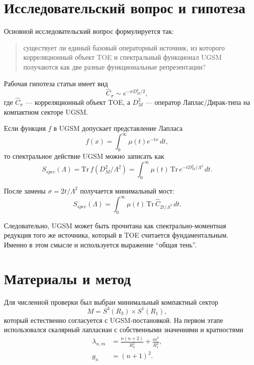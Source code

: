 \documentclass[12pt,a4paper]{article}
\begin{document}
\section{Исследовательский вопрос и гипотеза}

Основной исследовательский вопрос формулируется так:
\begin{quote}
существует ли единый базовый операторный источник, из которого корреляционный объект TOE и спектральный функционал UGSM получаются как две разные функциональные репрезентации?
\end{quote}

Рабочая гипотеза статьи имеет вид
\begin{equation}
\hat C_\sigma \sim e^{-\sigma D_M^2/2},
\end{equation}
где \(\hat C_\sigma\) --- корреляционный объект TOE, а \(D_M^2\) --- оператор Лаплас/Дирак-типа на компактном секторе UGSM.

Если функция \(f\) в UGSM допускает представление Лапласа
\begin{equation}
f(x)=\int_0^{\infty}\mu(t)e^{-tx}\,dt,
\end{equation}
то спектральное действие UGSM можно записать как
\begin{equation}
S_{spec}(\Lambda)=\mathrm{Tr}\,f(D_M^2/\Lambda^2)
=\int_0^{\infty}\mu(t)\,\mathrm{Tr}\,e^{-tD_M^2/\Lambda^2}\,dt.
\end{equation}

После замены \(\sigma=2t/\Lambda^2\) получается минимальный мост:
\begin{equation}
S_{spec}(\Lambda)=\int_0^{\infty}\mu(t)\,\mathrm{Tr}\,\hat C_{2t/\Lambda^2}\,dt.
\end{equation}

Следовательно, UGSM может быть прочитана как спектрально-моментная редукция того же источника, который в TOE считается фундаментальным. Именно в этом смысле и используется выражение ``общая тень''.

\section{Материалы и метод}

Для численной проверки был выбран минимальный компактный сектор
\[
M=S^3(R_3)\times S^1(R_1),
\]
который естественно согласуется с UGSM-постановкой. На первом этапе использовался скалярный лапласиан с собственными значениями и кратностями
\begin{align}
\lambda_{n,m} &= \frac{n(n+2)}{R_3^2}+\frac{m^2}{R_1^2},\\
 g_n &= (n+1)^2.
\end{align}
\end{document}
